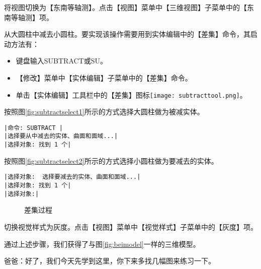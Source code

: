 \begin{procedure}
\item 将视图切换为【东南等轴测】。点击【视图】菜单中【三维视图】子菜单中的【东南等轴测】项。
\item 从大圆柱中减去小圆柱。要实现该操作需要用到实体编辑中的【差集】命令，其启动方法有：
\begin{itemize}
\item 键盘输入SUBTRACT或SU。
\item 【修改】菜单中【实体编辑】子菜单中的【差集】命令。
\item 单击【实体编辑】工具栏中的【差集】图标\texttt{[image: subtracttool.png]}。
\end{itemize}
按照图\ref{fig:subtractselect1}所示的方式选择大圆柱做为被减实体。
\begin{lstlisting}
|命令: SUBTRACT |
|选择要从中减去的实体、曲面和面域...|
|选择对象: 找到 1 个|
\end{lstlisting}
按照图\ref{fig:subtractselect2}所示的方式选择小圆柱做为要减去的实体。
\begin{lstlisting}
|选择对象:  选择要减去的实体、曲面和面域...|
|选择对象: 找到 1 个|
|选择对象:|
\end{lstlisting}
\begin{figure}[htbp]
\centering
{}\hspace{20pt}
\caption{差集过程}
\end{figure}
\item 切换视觉样式为灰度。点击【视图】菜单中【视觉样式】子菜单中的【灰度】项。
\end{procedure}

通过上述步骤，我们获得了与图\ref{fig:beimodel}一样的三维模型。

爸爸：好了，我们今天先学到这里，你下来多找几幅图来练习一下。
\endinput